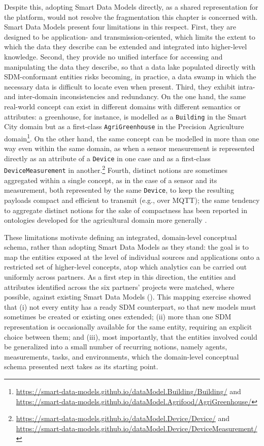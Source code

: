 Despite this, adopting Smart Data Models directly, as a shared representation for the platform, would not resolve the fragmentation this chapter is concerned with. Smart Data Models present four limitations in this respect. First, they are designed to be application- and transmission-oriented, which limits the extent to which the data they describe can be extended and integrated into higher-level knowledge. Second, they provide no unified interface for accessing and manipulating the data they describe, so that a data lake populated directly with SDM-conformant entities risks becoming, in practice, a data swamp in which the necessary data is difficult to locate even when present. Third, they exhibit intra- and inter-domain inconsistencies and redundancy. On the one hand, the same real-world concept can exist in different domains with different semantics or attributes: a greenhouse, for instance, is modelled as a \texttt{Building} in the Smart City domain but as a first-class \texttt{AgriGreenhouse} in the Precision Agriculture domain\footnote{\url{https://smart-data-models.github.io/dataModel.Building/Building/} and \url{https://smart-data-models.github.io/dataModel.Agrifood/AgriGreenhouse/}}. On the other hand, the same concept can be modelled in more than one way even within the same domain, as when a sensor measurement is represented directly as an attribute of a \texttt{Device} in one case and as a first-class \texttt{DeviceMeasurement} in another.\footnote{\url{https://smart-data-models.github.io/dataModel.Device/Device/} and \url{https://smart-data-models.github.io/dataModel.Device/DeviceMeasurement/}} Fourth, distinct notions are sometimes aggregated within a single concept, as in the case of a sensor and its measurement, both represented by the same \texttt{Device}, to keep the resulting payloads compact and efficient to transmit (e.g., over MQTT); the same tendency to aggregate distinct notions for the sake of compactness has been reported in ontologies developed for the agricultural domain more generally \cite{jonquet2018agroportal,hu2011agont}.

These limitations motivate defining an integrated, domain-level conceptual schema, rather than adopting Smart Data Models as they stand: the goal is to map the entities exposed at the level of individual sources and applications onto a restricted set of higher-level concepts, atop which analytics can be carried out uniformly across partners. As a first step in this direction, the entities and attributes identified across the six partners' projects were matched, where possible, against existing Smart Data Models (). This mapping exercise showed that (i) not every entity has a ready SDM counterpart, so that new models must sometimes be created or existing ones extended; (ii) more than one SDM representation is occasionally available for the same entity, requiring an explicit choice between them; and (iii), most importantly, that the entities involved could be generalized into a small number of recurring notions, namely agents, measurements, tasks, and environments, which the domain-level conceptual schema presented next takes as its starting point.

